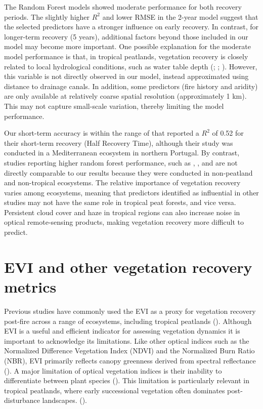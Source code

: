 \documentclass[
  fontsize=12pt,
  paper=a4,
  parskip=half,
  headings=big,
  DIV=12
]{scrreprt}
\begin{document}
The Random Forest models showed moderate performance for both recovery periods. The slightly higher $R^2$ and lower RMSE in the 2-year model suggest that the selected predictors have a stronger influence on early recovery. In contrast, for longer-term recovery (5 years), additional factors beyond those included in our model may become more important. One possible explanation for the moderate model performance is that, in tropical peatlands, vegetation recovery is closely related to local hydrological conditions, such as water table depth ({\cite{hooijer_benefits_2024}}; {\cite{giesen_roles_2023}}; {\cite{ismail_recent_2023}}). However, this variable is not directly observed in our model, instead approximated using distance to drainage canals. In addition, some predictors (fire history and aridity) are only available at relatively coarse spatial resolution (approximately 1 km). This may not capture small-scale variation, thereby limiting the model performance.

Our short-term accuracy is within the range of {\cite{joao_indicator-based_2018}} that reported a $R^2$ of 0.52 for their short-term recovery (Half Recovery Time), although their study was conducted in a Mediterranean ecosystem in northern Portugal. By contrast, studies reporting higher random forest performance, such as \textcite{bright_examining_2019}, \textcite{qiu_quantifying_2021}, and \textcite{zahura_impact_2024} are not directly comparable to our results because they were conducted in non-peatland and non-tropical ecosystems. The relative importance of vegetation recovery varies among ecosystems, meaning that predictors identified as influential in other studies may not have the same role in tropical peat forests, and vice versa. Persistent cloud cover and haze in tropical regions can also increase noise in optical remote-sensing products, making vegetation recovery more difficult to predict.


\section{EVI and other vegetation recovery metrics}

Previous studies have commonly used the EVI as a proxy for vegetation recovery post-fire across a range of ecosystems, including tropical peatlands (\cite{perez-cabello_remote_2021}). Although EVI is a useful and efficient indicator for assessing vegetation dynamics it is important to acknowledge its limitations. Like other optical indices such as the Normalized Difference Vegetation Index (NDVI) and the Normalized Burn Ratio (NBR), EVI primarily reflects canopy greenness derived from spectral reflectance (\cite{bousquet_monitoring_2022}). A major limitation of optical vegetation indices is their inability to differentiate between plant species (\cite{perez-cabello_remote_2021}). This limitation is particularly relevant in tropical peatlands, where early successional vegetation often dominates post-disturbance landscapes. (\cite{blackham_natural_2014}).
\end{document}
